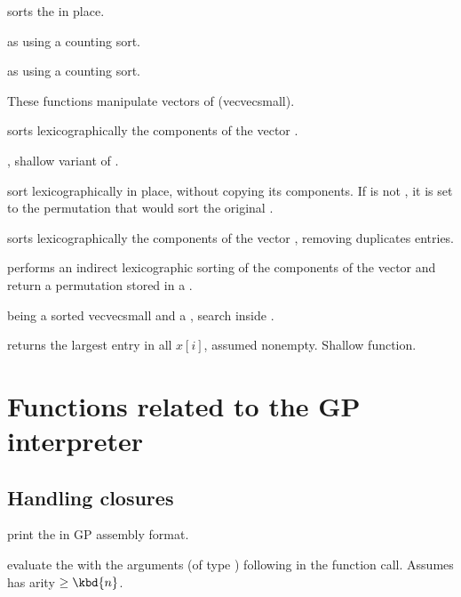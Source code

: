  sorts the 
 in place.

 as
 using a counting sort.

 as
 using a counting sort.

These functions manipulate vectors of  (vecvecsmall).

 sorts lexicographically the components of
the vector .

, shallow variant of
.

 sort lexicographically
 in place, without copying its components. If
 is not , it is set to the permutation that would sort
the original .

 sorts lexicographically the components of
the vector , removing duplicates entries.

 performs an indirect lexicographic
sorting of the components of the vector  and return a permutation
stored in a .

  being a sorted
vecvecsmall and  a , search  inside .

 returns the largest entry in all $x[i]$,
assumed nonempty. Shallow function.

\newpage
\chapter{Functions related to the GP interpreter}

\section{Handling closures}\label{se:closure}


 print the   in
GP assembly format.

 evaluate the 
 with the  arguments (of type ) following  in
the function call. Assumes  has arity $\geq \kbd{n}$.

